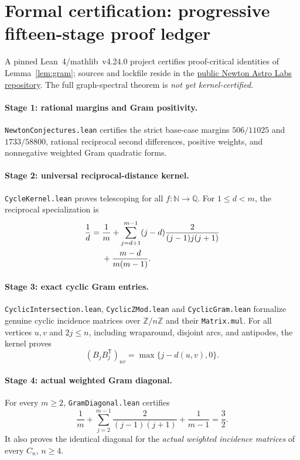 \section{Formal certification: progressive fifteen-stage proof ledger}\label{sec:formal}
A pinned Lean~4/mathlib~v4.24.0 project certifies proof-critical
identities of Lemma~\ref{lem:gram}; sources and lockfile reside in the
\href{https://github.com/tonynewton79-web/newton-400-conjectures}{public
Newton Astro Labs repository}. The full graph-spectral theorem is
\emph{not yet kernel-certified}.

\paragraph{Stage 1: rational margins and Gram positivity.}
\texttt{NewtonConjectures.lean} certifies the strict base-case margins
$506/11025$ and $1733/58800$, rational reciprocal second differences,
positive weights, and nonnegative weighted Gram quadratic forms.

\paragraph{Stage 2: universal reciprocal-distance kernel.}
\texttt{CycleKernel.lean} proves telescoping for all
$f:\mathbb N\to\mathbb Q$. For $1\le d<m$, the reciprocal
specialization is
\begin{align}\label{eq:lean-kernel}
\frac1d={}&\frac1m+
\sum_{j=d+1}^{m-1}(j-d)\frac{2}{(j-1)j(j+1)}\notag\\
&+\frac{m-d}{m(m-1)}.
\end{align}

\paragraph{Stage 3: exact cyclic Gram entries.}
\texttt{CyclicIntersection.lean}, \texttt{CyclicZMod.lean}
and \texttt{CyclicGram.lean} formalize genuine cyclic incidence
matrices over $\mathbb Z/n\mathbb Z$ and their \texttt{Matrix.mul}.
For all vertices $u,v$ and $2j\le n$, including wraparound,
disjoint arcs, and antipodes, the kernel proves
\begin{equation}\label{eq:lean-overlap}
(B_jB_j^{\mathsf T})_{uv}=\max\{j-d(u,v),0\}.
\end{equation}

\paragraph{Stage 4: actual weighted Gram diagonal.}
For every $m\ge2$, \texttt{GramDiagonal.lean} certifies
\begin{equation}\label{eq:lean-diag}
\frac1m+\sum_{j=2}^{m-1}\frac{2}{(j-1)(j+1)}
+\frac1{m-1}=\frac32.
\end{equation}
It also proves the identical diagonal for the \emph{actual weighted
incidence matrices} of every $C_n$, $n\ge4$.

